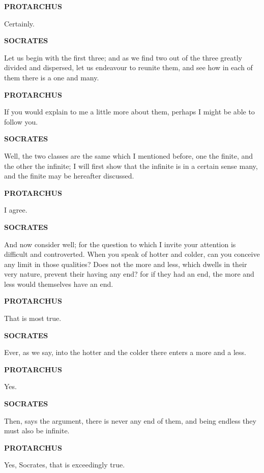 \documentclass[11pt,letter]{article}
\begin{document}
\par \textbf{PROTARCHUS}
\par   Certainly.

\par \textbf{SOCRATES}
\par   Let us begin with the first three; and as we find two out of the three greatly divided and dispersed, let us endeavour to reunite them, and see how in each of them there is a one and many.

\par \textbf{PROTARCHUS}
\par   If you would explain to me a little more about them, perhaps I might be able to follow you.

\par \textbf{SOCRATES}
\par   Well, the two classes are the same which I mentioned before, one the finite, and the other the infinite; I will first show that the infinite is in a certain sense many, and the finite may be hereafter discussed.

\par \textbf{PROTARCHUS}
\par   I agree.

\par \textbf{SOCRATES}
\par   And now consider well; for the question to which I invite your attention is difficult and controverted. When you speak of hotter and colder, can you conceive any limit in those qualities? Does not the more and less, which dwells in their very nature, prevent their having any end? for if they had an end, the more and less would themselves have an end.

\par \textbf{PROTARCHUS}
\par   That is most true.

\par \textbf{SOCRATES}
\par   Ever, as we say, into the hotter and the colder there enters a more and a less.

\par \textbf{PROTARCHUS}
\par   Yes.

\par \textbf{SOCRATES}
\par   Then, says the argument, there is never any end of them, and being endless they must also be infinite.

\par \textbf{PROTARCHUS}
\par   Yes, Socrates, that is exceedingly true.
\end{document}

